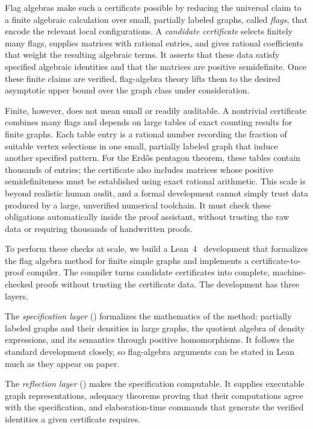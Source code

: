 \documentclass[acmsmall,screen=true,acmthm=false]{acmart}
\newcommand{\boldparagraph}[1]{\noindentparagraph{\textnormal{\textbf{#1}}}}
\begin{document}
Flag algebras make such a certificate possible by reducing the universal claim
to a finite algebraic calculation over small, partially labeled graphs, called
\emph{flags}, that encode the relevant local configurations.  A
\emph{candidate certificate} selects finitely many flags, supplies matrices
with rational entries, and gives rational coefficients that weight the
resulting algebraic terms.  It asserts that these data satisfy specified
algebraic identities and that the matrices are positive semidefinite.  Once
these finite claims are verified, flag-algebra theory lifts them to the desired
asymptotic upper bound over the graph class under consideration.

Finite, however, does not mean small or readily auditable.  A nontrivial
certificate combines many flags and depends on large tables of exact counting
results for finite graphs.  Each table entry is a rational number recording the
fraction of suitable vertex selections in one small, partially labeled graph
that induce another specified pattern.  For the Erd\H{o}s pentagon theorem,
these tables contain thousands of entries; the certificate also includes
matrices whose positive semidefiniteness must be established using exact
rational arithmetic.  This scale is beyond realistic human audit, and a formal
development cannot simply trust data produced by a large, unverified numerical
toolchain.  It must check these obligations automatically inside the proof
assistant, without trusting the raw data or requiring thousands of handwritten
proofs.

\boldparagraph{A certificate-to-proof compiler.}
To perform these checks at scale, we build a Lean~4~\cite{moura2021lean}
development that formalizes the flag algebra method for finite simple graphs
and implements a certificate-to-proof compiler.  The compiler turns candidate
certificates into complete, machine-checked proofs without trusting the
certificate data.  The development has three layers.

The \emph{specification layer} () formalizes the
mathematics of the method: partially labeled graphs and their densities
in large graphs, the quotient algebra of density expressions, and its
semantics through positive homomorphisms.  It
follows the standard development closely, so flag-algebra arguments can
be stated in Lean much as they appear on paper.

The \emph{reflection layer} () makes the
specification computable.  It supplies executable graph
representations, adequacy theorems proving that their computations
agree with the specification, and elaboration-time commands that
generate the verified identities a given certificate requires.
\end{document}
